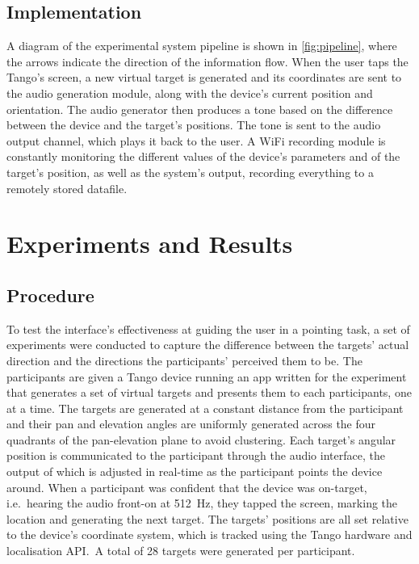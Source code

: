 \documentclass{llncs}
\begin{document}
\subsection{Implementation}

A diagram of the experimental system pipeline is shown in \cref{fig:pipeline}, where the arrows indicate the direction of the information flow.
When the user taps the Tango's screen, a new virtual target is generated and its coordinates are sent to the audio generation module, along with the device's current position and orientation.
The audio generator then produces a tone based on the difference between the device and the target's positions. The tone is sent to the audio output channel, which plays it back to the user.
A WiFi recording module is constantly monitoring the different values of the device's parameters and of the target's position, as well as the system's output, recording everything to a remotely stored datafile. 

\section{Experiments and Results}\label{sec:experiment-and-results}

\subsection{Procedure}

To test the interface's effectiveness at guiding the user in a pointing task, a set of experiments were conducted to capture the difference between the targets' actual direction and the directions the participants' perceived them to be.
The participants are given a Tango device running an app written for the experiment that generates a set of virtual targets and presents them to each participants, one at a time. 
The targets are generated at a constant distance from the participant and their pan and elevation angles are uniformly generated across the four quadrants of the pan-elevation plane to avoid clustering.
Each target's angular position is communicated to the participant through the audio interface, the output of which is adjusted in real-time as the participant points the device around. 
When a participant was confident that the device was on-target, i.e.~hearing the audio front-on at \SI{512}{\hertz}, they tapped the screen, marking the location and generating the next target.
The targets' positions are all set relative to the device's coordinate system, which is tracked using the Tango hardware and localisation API.\
A total of 28 targets were generated per participant. 
\end{document}
